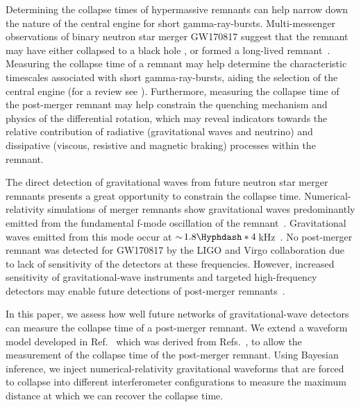 \documentclass[
reprint,
prd,
twocolumn,
nofootinbib,
tightenlines %
floatfix,
 amsmath,
showpacs ,amssymb, aps,%
superscriptaddress
]{revtex4-1}
\begin{document}
    Determining the collapse times of hypermassive remnants can help narrow down the nature of the central engine for short gamma-ray-bursts. 
    Multi-messenger observations of binary neutron star merger GW170817 suggest that the remnant may have either collapsed to a black hole \cite[e.g.,][]{Metzger2018,Gill2019,Murguia-Berthier2020}, or formed a long-lived remnant~\cite[e.g.][]{Yu2018}.
    Measuring the collapse time of a remnant may help determine the characteristic timescales associated with short gamma-ray-bursts, aiding the selection of the central engine (for a review see \cite{Zhang2019}).
    Furthermore, measuring the collapse time of the post-merger remnant may help constrain the quenching mechanism and physics of the differential rotation, which may reveal indicators towards the relative contribution of radiative (gravitational waves and neutrino) and dissipative (viscous, resistive and magnetic braking) processes within the remnant.\par

    The direct detection of gravitational waves from future neutron star merger remnants presents a great opportunity to constrain the collapse time.
    Numerical-relativity simulations of merger remnants show gravitational waves predominantly emitted from the fundamental f-mode oscillation of the remnant~\cite{Zhuge1994,Stergioulas2011}.
    Gravitational waves emitted from this mode occur at $\sim\!1.8\Hyphdash*4$\,kHz~\cite{Takami2015,Bernuzzi2015}.
    No post-merger remnant was detected for GW170817 by the LIGO and Virgo collaboration due to lack of sensitivity of the detectors at these frequencies. 
    However, increased sensitivity of gravitational-wave instruments and targeted high-frequency detectors  may enable future detections of post-merger remnants~\cite[e.g.,][]{Martynov2019,NEMO2020}. \par
    
    In this paper, we assess how well future networks of gravitational-wave detectors can measure the collapse time of a post-merger remnant.
    We extend a waveform model developed in Ref.~\cite{Easter2020} which was derived from Refs.~\cite{Bauswein2016,Bose2018}, to allow the measurement of the collapse time of the post-merger remnant.
    Using Bayesian inference, we inject numerical-relativity gravitational waveforms that are forced to collapse into different interferometer configurations to measure the maximum distance at which we can recover the collapse time.\par
\end{document}
